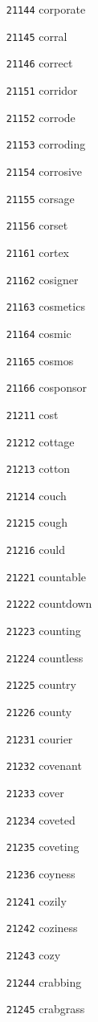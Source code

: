 \documentclass[twoside,11pt]{article}
\begin{document}
\begin{multicols}{5}
\begin{enumerate}
\item[\texttt{21144}] corporate
\item[\texttt{21145}] corral
\item[\texttt{21146}] correct
\item[\texttt{21151}] corridor
\item[\texttt{21152}] corrode
\item[\texttt{21153}] corroding
\item[\texttt{21154}] corrosive
\item[\texttt{21155}] corsage
\item[\texttt{21156}] corset
\item[\texttt{21161}] cortex
\item[\texttt{21162}] cosigner
\item[\texttt{21163}] cosmetics
\item[\texttt{21164}] cosmic
\item[\texttt{21165}] cosmos
\item[\texttt{21166}] cosponsor
\item[\texttt{21211}] cost
\item[\texttt{21212}] cottage
\item[\texttt{21213}] cotton
\item[\texttt{21214}] couch
\item[\texttt{21215}] cough
\item[\texttt{21216}] could
\item[\texttt{21221}] countable
\item[\texttt{21222}] countdown
\item[\texttt{21223}] counting
\item[\texttt{21224}] countless
\item[\texttt{21225}] country
\item[\texttt{21226}] county
\item[\texttt{21231}] courier
\item[\texttt{21232}] covenant
\item[\texttt{21233}] cover
\item[\texttt{21234}] coveted
\item[\texttt{21235}] coveting
\item[\texttt{21236}] coyness
\item[\texttt{21241}] cozily
\item[\texttt{21242}] coziness
\item[\texttt{21243}] cozy
\item[\texttt{21244}] crabbing
\item[\texttt{21245}] crabgrass

\end{enumerate}
\end{multicols}
\end{document}
